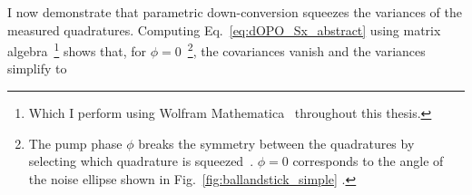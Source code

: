 I now demonstrate that parametric down-conversion squeezes the variances of the measured quadratures.
Computing Eq.~\ref{eq:dOPO_Sx_abstract} using matrix algebra~\footnote{Which I perform using Wolfram Mathematica~\cite{} throughout this thesis.} shows that, for $\phi=0$~\footnote{The pump phase $\phi$ breaks the symmetry between the quadratures by selecting which quadrature is squeezed~\cite{}. $\phi=0$ corresponds to the angle of the noise ellipse shown in Fig.~\ref{fig:ballandstick_simple} .}, the covariances vanish and the variances simplify to~\cite{} 
